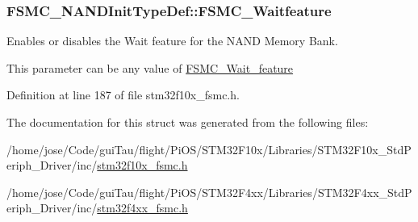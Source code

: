 \hypertarget{struct_f_s_m_c___n_a_n_d_init_type_def_ab350e15014c4a9f4b2c2f2848f11eeca}{
\subsubsection[{F\-S\-M\-C\-\_\-\-Waitfeature}]{ F\-S\-M\-C\-\_\-\-N\-A\-N\-D\-Init\-Type\-Def\-::\-F\-S\-M\-C\-\_\-\-Waitfeature}}\label{struct_f_s_m_c___n_a_n_d_init_type_def_ab350e15014c4a9f4b2c2f2848f11eeca}
\begin{DoxyVerb}      Enables or disables the Wait feature for the NAND Memory Bank.
\end{DoxyVerb}
 This parameter can be any value of \hyperlink{group___f_s_m_c___wait__feature}{F\-S\-M\-C\-\_\-\-Wait\-\_\-feature} 

Definition at line 187 of file stm32f10x\-\_\-fsmc.\-h.



The documentation for this struct was generated from the following files\-:\begin{DoxyCompactItemize}
\item 
/home/jose/\-Code/gui\-Tau/flight/\-Pi\-O\-S/\-S\-T\-M32\-F10x/\-Libraries/\-S\-T\-M32\-F10x\-\_\-\-Std\-Periph\-\_\-\-Driver/inc/\hyperlink{stm32f10x__fsmc_8h}{stm32f10x\-\_\-fsmc.\-h}\item 
/home/jose/\-Code/gui\-Tau/flight/\-Pi\-O\-S/\-S\-T\-M32\-F4xx/\-Libraries/\-S\-T\-M32\-F4xx\-\_\-\-Std\-Periph\-\_\-\-Driver/inc/\hyperlink{stm32f4xx__fsmc_8h}{stm32f4xx\-\_\-fsmc.\-h}\end{DoxyCompactItemize}

